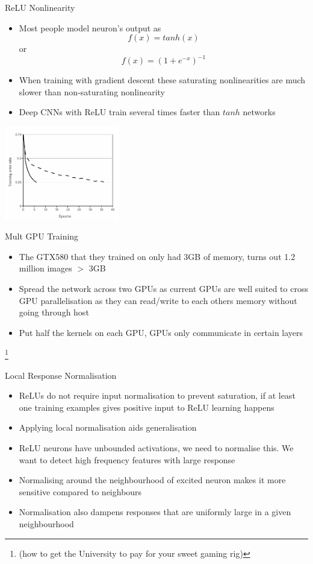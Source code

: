 \documentclass{beamer}
\begin{document}
\begin{frame}{ReLU Nonlinearity}
	\begin{itemize}
		\item Most people model neuron's output as $$f(x) = tanh(x)$$ or $$f(x)=(1+e^{-x})^{-1}$$
		\item When training with gradient descent these saturating nonlinearities are much slower than non-saturating nonlinearity
		\item Deep CNNs with ReLU train several times faster than $tanh$ networks
	\end{itemize}
	\begin{center}
		\includegraphics[width=5cm]{ReLU}
	\end{center}

\end{frame}


\begin{frame}{Mult GPU Training}
	\begin{itemize}
		\item The GTX580 that they trained on only had 3GB of memory, turns out 1.2 million images $>$ 3GB
		\item Spread the network across two GPUs as current GPUs are well suited to cross GPU parallelisation as they can read/write to each others memory without going through host
		\item Put half the kernels on each GPU, GPUs only communicate in certain layers 
	\end{itemize}
	
\let\thefootnote\relax\footnote{(how to get the University to pay for your sweet gaming rig)}
\end{frame}

\begin{frame}{Local Response Normalisation}
	\begin{itemize}
		\item ReLUs do not require input normalisation to prevent saturation, if at least one training examples gives positive input to ReLU learning happens
		\item Applying local normalisation aids generalisation 
		\item ReLU neurons have unbounded activations, we need to normalise this. We want to detect high frequency features with large response
		\item Normalising around the neighbourhood of excited neuron makes it more sensitive compared to neighbours
		\item Normalisation also dampens responses that are uniformly large in a given neighbourhood 
	\end{itemize}
\end{frame}
\end{document}
